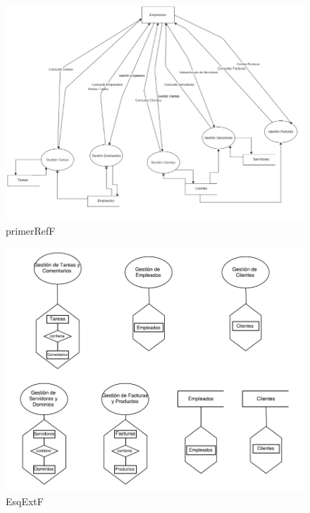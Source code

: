 \documentclass[paper=a4, fontsize=11pt, spanish]{scrartcl}
\begin{document}
\begin{figure}
	\includegraphics[width=1.20\textwidth]{PrimerRefF.png}
	\caption{primerRefF}
	\label{fig:primerRefF}
\end{figure}

\begin{figure}
	\includegraphics[width=1.25\textwidth]{EsqExtF.png}
	\caption{EsqExtF}
	\label{fig:EsqExtF}
\end{figure}
\end{document}
